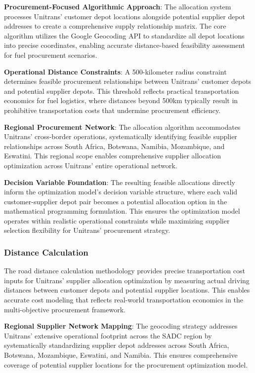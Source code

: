 \textbf{Procurement-Focused Algorithmic Approach}: The allocation system processes Unitrans' customer depot locations alongside potential supplier depot addresses to create a comprehensive supply relationship matrix. The core algorithm utilizes the Google Geocoding API to standardize all depot locations into precise coordinates, enabling accurate distance-based feasibility assessment for fuel procurement scenarios.

\textbf{Operational Distance Constraints}: A 500-kilometer radius constraint determines feasible procurement relationships between Unitrans' customer depots and potential supplier depots. This threshold reflects practical transportation economics for fuel logistics, where distances beyond 500km typically result in prohibitive transportation costs that undermine procurement efficiency.

\textbf{Regional Procurement Network}: The allocation algorithm accommodates Unitrans' cross-border operations, systematically identifying feasible supplier relationships across South Africa, Botswana, Namibia, Mozambique, and Eswatini. This regional scope enables comprehensive supplier allocation optimization across Unitrans' entire operational network.

\textbf{Decision Variable Foundation}: The resulting feasible allocations directly inform the optimization model's decision variable structure, where each valid customer-supplier depot pair becomes a potential allocation option in the mathematical programming formulation. This ensures the optimization model operates within realistic operational constraints while maximizing supplier selection flexibility for Unitrans' procurement strategy.

\subsubsection{Distance Calculation}
The road distance calculation methodology provides precise transportation cost inputs for Unitrans' supplier allocation optimization by measuring actual driving distances between customer depots and potential supplier locations. This enables accurate cost modeling that reflects real-world transportation economics in the multi-objective procurement framework.

\textbf{Regional Supplier Network Mapping}: The geocoding strategy addresses Unitrans' extensive operational footprint across the SADC region by systematically standardizing supplier depot addresses across South Africa, Botswana, Mozambique, Eswatini, and Namibia. This ensures comprehensive coverage of potential supplier locations for the procurement optimization model.

